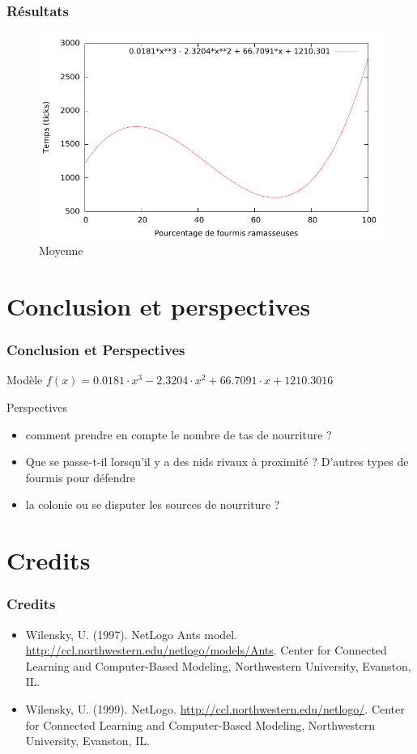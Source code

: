\documentclass{beamer}
\begin{document}
\begin{frame}
\frametitle{Résultats}
\begin{figure}
\includegraphics[scale=0.8]{avg.pdf}
\caption{Moyenne}
\end{figure}
\end{frame}

\section{Conclusion et perspectives}
\begin{frame}
\frametitle{Conclusion et Perspectives}

\begin{block}{Modèle}
\begin{math}
 f(x) = 0.0181\cdot x^3 - 2.3204\cdot x^2 + 66.7091\cdot x + 1210.3016
\end{math}
\end{block}

\begin{block}{Perspectives}
\begin{itemize}
\item comment prendre en compte le nombre de tas de nourriture ?
\item Que se passe-t-il lorsqu'il y a des nids rivaux à proximité ? D'autres types de fourmis pour défendre
\item la colonie ou se disputer les sources de nourriture ?
\end{itemize}
\end{block}
\end{frame}

\section{Credits}
\begin{frame}
\frametitle{Credits}
\begin{itemize}
\item Wilensky, U. (1997). NetLogo Ants model. \url{http://ccl.northwestern.edu/netlogo/models/Ants}. Center for Connected Learning and Computer-Based Modeling, Northwestern University, Evanston, IL.
\item Wilensky, U. (1999). NetLogo. \url{http://ccl.northwestern.edu/netlogo/}. Center for Connected Learning and Computer-Based Modeling, Northwestern University, Evanston, IL.
\end{itemize}
\end{frame}
\end{document}
